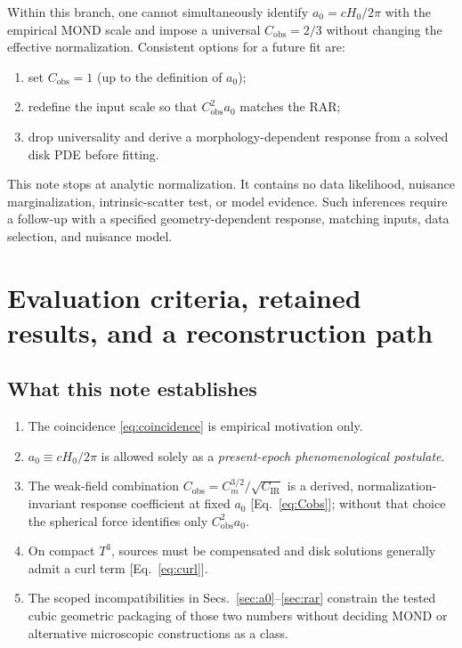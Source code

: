 \documentclass[aps,prd,reprint,superscriptaddress,nofootinbib,floatfix,showkeys]{revtex4-2}
\newcommand{\Tthree}{T^{3}}
\newcommand{\Cobs}{C_{\mathrm{obs}}}
\newcommand{\Cm}{C_{m}}
\newcommand{\CIR}{C_{\mathrm{IR}}}
\newcommand{\azero}{a_{0}}
\newcommand{\Hzero}{H_{0}}
\begin{document}
Within this branch, one cannot simultaneously identify
\(\azero=c\Hzero/2\pi\) with the empirical MOND scale and impose a universal
\(\Cobs=2/3\) without changing the effective normalization.  Consistent
options for a future fit are:
\begin{enumerate}
\item set \(\Cobs=1\) (up to the definition of \(\azero\));
\item redefine the input scale so that \(\Cobs^{2}\azero\) matches the RAR;
\item drop universality and derive a morphology-dependent response from a
  solved disk PDE before fitting.
\end{enumerate}

This note stops at analytic normalization. It contains no data likelihood,
nuisance marginalization, intrinsic-scatter test, or model evidence. Such
inferences require a follow-up with a specified geometry-dependent response,
matching inputs, data selection, and nuisance model.

\section{Evaluation criteria, retained results, and a reconstruction path}
\label{sec:path}

\subsection{What this note establishes}

\begin{enumerate}
\item The coincidence \eqref{eq:coincidence} is empirical motivation only.
\item \(\azero\equiv c\Hzero/2\pi\) is allowed solely as a
  \emph{present-epoch phenomenological postulate}.
\item The weak-field combination
  \(\Cobs=\Cm^{3/2}/\sqrt{\CIR}\) is a derived, normalization-invariant
  response coefficient at fixed \(\azero\) [Eq.~\eqref{eq:Cobs}]; without that
  choice the spherical force identifies only \(\Cobs^2\azero\).
\item On compact \(\Tthree\), sources must be compensated and disk solutions
  generally admit a curl term [Eq.~\eqref{eq:curl}].
\item The scoped incompatibilities in Secs.~\ref{sec:a0}--\ref{sec:rar}
  constrain the tested cubic geometric packaging of those two numbers without
  deciding MOND or alternative microscopic constructions as a class.
\end{enumerate}
\end{document}
